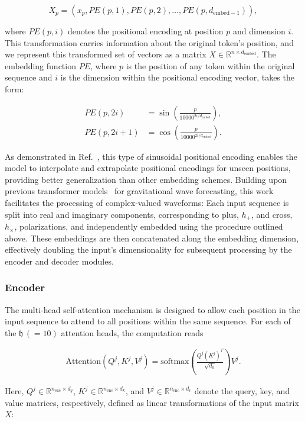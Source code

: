 \documentclass[12pt]{iopart}
\begin{document}
\[
X_p = (x_p, PE(p, 1), PE(p, 2), \dots, PE(p, d_{\text{embed}-1})),
\]

where \(PE(p, i)\) denotes the positional encoding at position \(p\) and dimension \(i\). This transformation carries information about the original token's position, and we represent this transformed set of vectors as a matrix \(X \in \mathbb{R}^{n \times d_{\text{embed}}}\). The embedding function \(PE\), where \(p\) is the position of any token within the original sequence and \(i\) is the dimension within the positional encoding vector, takes the form:

\begin{align}
PE(p, 2i) &= \sin\left(\frac{p}{10000^{2i/d_{\text{embed}}}}\right), \\
PE(p, 2i+1) &= \cos\left(\frac{p}{10000^{2i/d_{\text{embed}}}}\right).
\end{align}

As demonstrated in Ref.~\cite{vaswani2017attention}, this type of sinusoidal positional encoding enables the model to interpolate and extrapolate positional encodings for unseen positions, providing better generalization than other embedding schemes. Building upon previous transformer models~\cite{khan_huerta_forecast} for gravitational wave forecasting, this work facilitates the processing of complex-valued waveforms: Each input sequence is split into real and imaginary components, corresponding to plus, \(h_+\), and cross, \(h_\times\), polarizations, and independently embedded using the procedure outlined above. These embeddings are then concatenated along the embedding dimension, effectively doubling the input's dimensionality for subsequent processing by the encoder and decoder modules.

\subsubsection{Encoder}
\label{sec:encoder}

The multi-head self-attention mechanism is designed to allow each position in the input sequence to attend to all positions within the same sequence. For each of the \(\mathfrak{h}\, (=10)\) attention heads, the computation reads

\begin{align}
 \text{Attention}(Q^j, K^j, V^j) = \text{softmax}\left(\frac{Q^j (K^j)^T}{\sqrt{d_k}}\right)V^j.
\end{align}

Here, \(Q^j \in \mathbb{R}^{n_{\text{enc}} \times d_q}\), \(K^j \in \mathbb{R}^{n_{\text{enc}} \times d_k}\), and \(V^j \in \mathbb{R}^{n_{\text{enc}} \times d_v}\) denote the query, key, and value matrices, respectively, defined as linear transformations of the input matrix \(X\):
\end{document}
